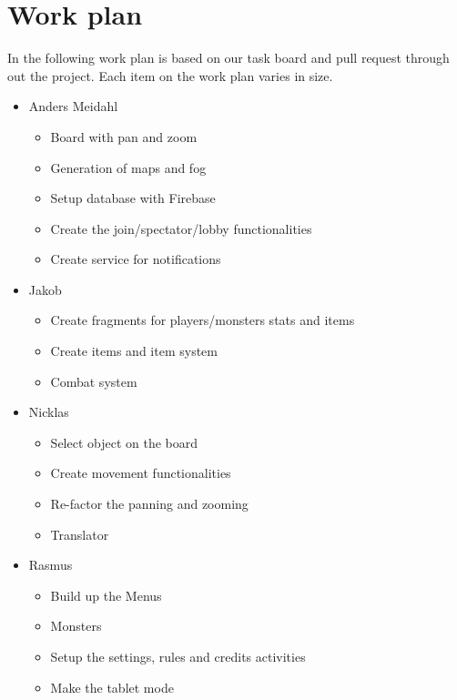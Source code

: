 \pagestyle{Uni}

\chapter{Work plan}
In the following work plan is based on our task board and pull request through out the project. Each item on the work plan varies in size.

\begin{itemize}
	\item Anders Meidahl
	\begin{itemize}
		\item Board with pan and zoom 
		\item Generation of maps and fog
		\item Setup database with Firebase
		\item Create the join/spectator/lobby functionalities
		\item Create service for notifications
	\end{itemize}
	
	\item Jakob
	\begin{itemize}
		\item Create fragments for players/monsters stats and items
		\item Create items and item system
		\item Combat system
	\end{itemize}
	\item Nicklas
	\begin{itemize}
		\item Select object on the board
		\item Create movement functionalities
		\item Re-factor the panning and zooming
		\item Translator
	\end{itemize}
	\item Rasmus
	\begin{itemize}
		\item Build up the Menus
		\item Monsters
		\item Setup the settings, rules and credits activities
		\item Make the tablet mode
	\end{itemize}
\end{itemize}
